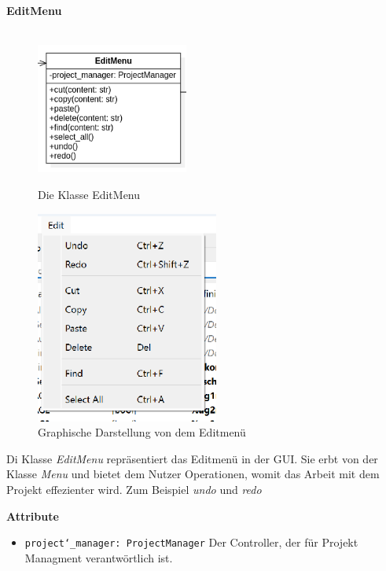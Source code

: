 \documentclass{article}
\begin{document}
\newpage
\textbf{\large{EditMenu}}\\\\
\begin{figure}[H]%
    \centering
    \begin{minipage}[b]{0.4\textwidth}
        \includegraphics[width=5cm]{entwurf/Entwurf_dokument/img/Alissa/EditMenuUpdated.png}
        \caption{Die Klasse EditMenu}
    \end{minipage}
    \hfill
    \begin{minipage}[b]{0.4\textwidth}
        \includegraphics[width=6cm]{entwurf/Entwurf_dokument/img/Alissa/FileMenuGUI.png} %
        \caption{Graphische Darstellung von dem Editmenü}
    \end{minipage}
\end{figure}
Di Klasse \textit{EditMenu} repräsentiert das Editmenü in der GUI. Sie erbt von der Klasse \textit{Menu} und bietet dem Nutzer Operationen, womit das Arbeit mit dem Projekt effezienter wird. Zum Beispiel \textit{undo} und \textit{redo}
\newline \newline

\textbf{{Attribute}}
\begin{itemize}
\item \texttt{project\char`_manager: ProjectManager} \newline Der Controller, der für Projekt Managment verantwörtlich ist.
\end{itemize}
\end{document}
